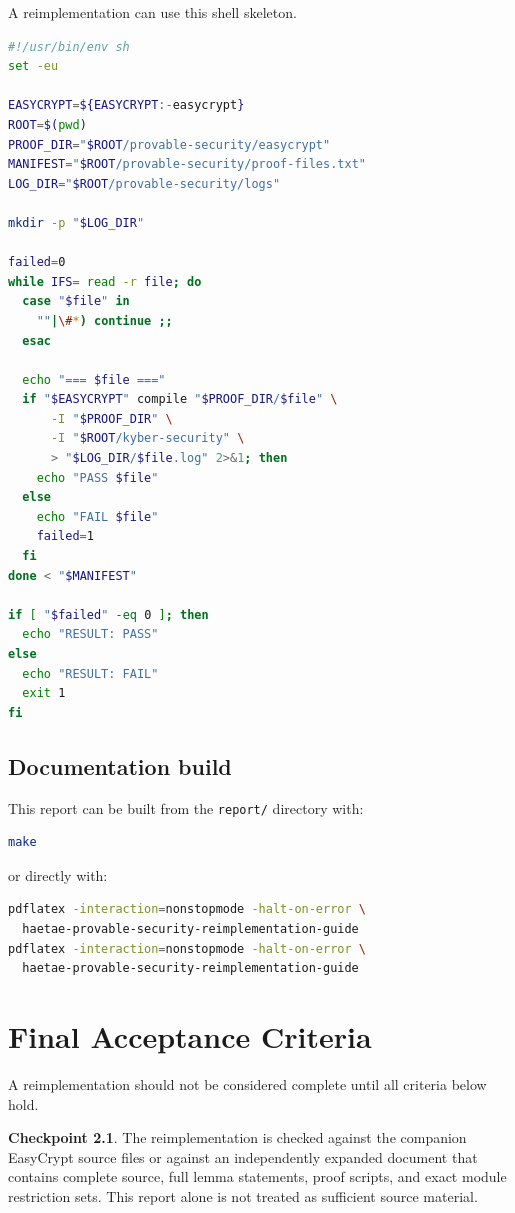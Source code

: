 \documentclass[11pt]{report}
\DeclareRobustCommand{\file}[1]{\ifmmode\text{\nolinkurl{#1}}\else\nolinkurl{#1}\fi}
\theoremstyle{definition}
\newtheorem{checkpoint}{Checkpoint}[chapter]
\theoremstyle{plain}
\begin{document}
A reimplementation can use this shell skeleton.

\begin{lstlisting}[language=bash]
#!/usr/bin/env sh
set -eu

EASYCRYPT=${EASYCRYPT:-easycrypt}
ROOT=$(pwd)
PROOF_DIR="$ROOT/provable-security/easycrypt"
MANIFEST="$ROOT/provable-security/proof-files.txt"
LOG_DIR="$ROOT/provable-security/logs"

mkdir -p "$LOG_DIR"

failed=0
while IFS= read -r file; do
  case "$file" in
    ""|\#*) continue ;;
  esac

  echo "=== $file ==="
  if "$EASYCRYPT" compile "$PROOF_DIR/$file" \
      -I "$PROOF_DIR" \
      -I "$ROOT/kyber-security" \
      > "$LOG_DIR/$file.log" 2>&1; then
    echo "PASS $file"
  else
    echo "FAIL $file"
    failed=1
  fi
done < "$MANIFEST"

if [ "$failed" -eq 0 ]; then
  echo "RESULT: PASS"
else
  echo "RESULT: FAIL"
  exit 1
fi
\end{lstlisting}

\section{Documentation build}

This report can be built from the \file{report/} directory with:

\begin{lstlisting}[language=bash]
make
\end{lstlisting}

or directly with:

\begin{lstlisting}[language=bash]
pdflatex -interaction=nonstopmode -halt-on-error \
  haetae-provable-security-reimplementation-guide
pdflatex -interaction=nonstopmode -halt-on-error \
  haetae-provable-security-reimplementation-guide
\end{lstlisting}

\chapter{Final Acceptance Criteria}

A reimplementation should not be considered complete until all criteria below
hold.

\begin{checkpoint}
The reimplementation is checked against the companion EasyCrypt source files or
against an independently expanded document that contains complete source, full
lemma statements, proof scripts, and exact module restriction sets.  This report
alone is not treated as sufficient source material.
\end{checkpoint}
\end{document}
